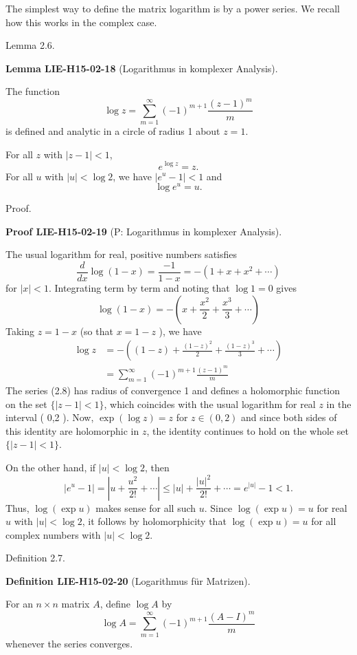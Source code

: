 \documentclass[10pt, letterpaper]{article}
\newcommand{\CustomHeading}[3]{%
  \par\medskip\noindent%
  \textbf{#1 #2} \textnormal{(#3)}.\enskip%
}
\newenvironment{DEF}[2]{\begin{unitbox}\CustomHeading{Definition}{#1}{#2}}{\end{unitbox}}
\newenvironment{LEM}[2]{\begin{unitbox}\CustomHeading{Lemma}{#1}{#2}}{\end{unitbox}}
\newenvironment{PROOF}[2]{\begin{unitbox}\CustomHeading{Proof}{#1}{#2}}{\end{unitbox}}
\begin{document}
The simplest way to define the matrix logarithm is by a power series. We recall how this works in the complex case.

Lemma 2.6. 

\begin{LEM}{LIE-H15-02-18}{Logarithmus in komplexer Analysis}
The function
$$
\log z=\sum_{m=1}^{\infty}(-1)^{m+1} \frac{(z-1)^{m}}{m}
$$
is defined and analytic in a circle of radius 1 about $z=1$.

For all $z$ with $|z-1|<1$,
$$
e^{\log z}=z .
$$
For all $u$ with $|u|<\log 2$, we have $\left|e^{u}-1\right|<1$ and
$$
\log e^{u}=u .
$$
\end{LEM}

Proof. 


\begin{PROOF}{LIE-H15-02-19}{P: Logarithmus in komplexer Analysis}
The usual logarithm for real, positive numbers satisfies
$$
\frac{d}{d x} \log (1-x)=\frac{-1}{1-x}=-\left(1+x+x^{2}+\cdots\right)
$$
for $|x|<1$. Integrating term by term and noting that $\log 1=0$ gives
$$
\log (1-x)=-\left(x+\frac{x^{2}}{2}+\frac{x^{3}}{3}+\cdots\right)
$$
Taking $z=1-x$ (so that $x=1-z$ ), we have
$$
\begin{aligned}
\log z & =-\left((1-z)+\frac{(1-z)^{2}}{2}+\frac{(1-z)^{3}}{3}+\cdots\right) \\
& =\sum_{m=1}^{\infty}(-1)^{m+1} \frac{(z-1)^{m}}{m}
\end{aligned}
$$
The series (2.8) has radius of convergence 1 and defines a holomorphic function on the set $\{|z-1|<1\}$, which coincides with the usual logarithm for real $z$ in the interval ( 0,2 ). Now, $\exp (\log z)=z$ for $z \in(0,2)$ and since both sides of this identity are holomorphic in $z$, the identity continues to hold on the whole set $\{|z-1|<1\}$.

On the other hand, if $|u|<\log 2$, then
$$
\left|e^{u}-1\right|=\left|u+\frac{u^{2}}{2!}+\cdots\right| \leq|u|+\frac{|u|^{2}}{2!}+\cdots=e^{|u|}-1<1 .
$$
Thus, $\log (\exp u)$ makes sense for all such $u$. Since $\log (\exp u)=u$ for real $u$ with $|u|<\log 2$, it follows by holomorphicity that $\log (\exp u)=u$ for all complex numbers with $|u|<\log 2$.
\end{PROOF}



Definition 2.7. 

\begin{DEF}{LIE-H15-02-20}{Logarithmus für Matrizen}
For an $n \times n$ matrix $A$, define $\log A$ by
$$
\log A=\sum_{m=1}^{\infty}(-1)^{m+1} \frac{(A-I)^{m}}{m}
$$
whenever the series converges.
\end{DEF}
\end{document}
